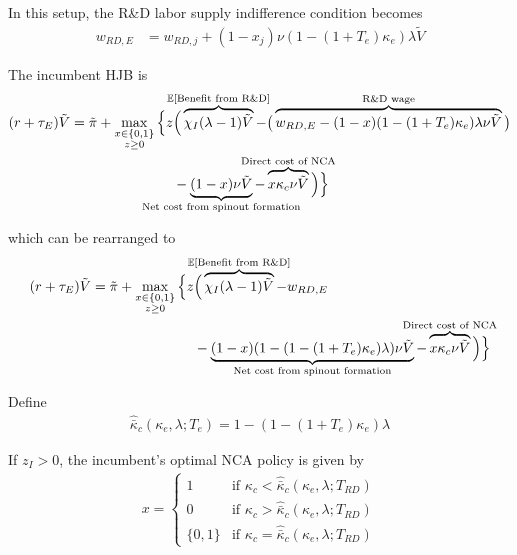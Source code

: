 \documentclass[11pt,english]{article}
\theoremstyle{remark}
\begin{document}
In this setup, the R\&D labor supply indifference condition becomes
\begin{align}
	w_{RD,E} &= w_{RD,j} + (1-x_j) \nu (1-(1+T_e)\kappa_e) \lambda \tilde{V} \label{eq:RD_worker_indifference_entryTax}
\end{align}

The incumbent HJB is
\begin{align}
(r + \tau_E) \tilde{V} = \tilde{\pi} + \max_{\substack{x \in \{0,1\} \\ z \ge 0}} \Big\{z &\Big( \overbrace{\chi_I (\lambda - 1) \tilde{V}}^{\mathclap{\mathbb{E}[\textrm{Benefit from R\&D}]}}-  \big( \overbrace{w_{RD,E} - (1-x)(1-(1+T_e)\kappa_e)\lambda \nu \tilde{V}}^{\mathclap{\text{R\&D wage}}}\big) \label{eq:hjb_incumbent_entryTax} \nonumber \\ 
&-  \underbrace{(1-x) \nu \tilde{V}}_{\mathclap{\text{Net cost from spinout formation}}} - \overbrace{x \kappa_{c} \nu \tilde{V}}^{\mathclap{\text{Direct cost of NCA}}}\Big) \Big\} 
\end{align}

which can be rearranged to
\begin{align}
(r + \tau_E) \tilde{V} = \tilde{\pi} + \max_{\substack{x \in \{0,1\} \\ z \ge 0}} \Big\{z &\Big( \overbrace{\chi_I (\lambda - 1) \tilde{V}}^{\mathclap{\mathbb{E}[\textrm{Benefit from R\&D}]}}- w_{RD,E} \\
&-  \underbrace{(1-x)(1 - (1-(1+T_e)\kappa_{e})\lambda)\nu \tilde{V}}_{\mathclap{\text{Net cost from spinout formation}}} - \overbrace{x \kappa_{c} \nu \tilde{V}}^{\mathclap{\text{Direct cost of NCA}}}\Big) \Big\} \label{eq:hjb_incumbent_entryTax_2}
\end{align}

Define
\begin{align}
\hat{\bar{\kappa}}_c(\kappa_e,\lambda;T_e) = 1 - (1-(1+T_e)\kappa_e)\lambda  \label{eq:barkappa_entryTax}
\end{align} 

If $z_I > 0$, the incumbent's optimal NCA policy is given by 
\begin{align}
x = \begin{cases}
1 & \textrm{if } \kappa_{c} < \hat{\bar{\kappa}}_c (\kappa_e, \lambda;T_{RD}) \\
0 & \textrm{if } \kappa_{c} > \hat{\bar{\kappa}}_c (\kappa_e, \lambda;T_{RD})\\
\{0,1\} & \textrm{if } \kappa_c = \hat{\bar{\kappa}}_c (\kappa_e, \lambda;T_{RD})
\end{cases} \label{eq:nca_policy_entryTax}
\end{align}
\end{document}
